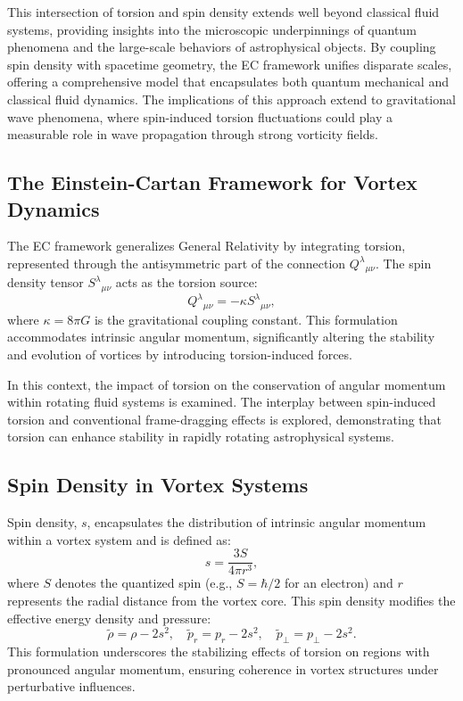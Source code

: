 \documentclass[a4paper,10pt]{article}
\begin{document}
This intersection of torsion and spin density extends well beyond classical fluid systems, providing insights into the microscopic underpinnings of quantum phenomena and the large-scale behaviors of astrophysical objects. By coupling spin density with spacetime geometry, the EC framework unifies disparate scales, offering a comprehensive model that encapsulates both quantum mechanical and classical fluid dynamics. The implications of this approach extend to gravitational wave phenomena, where spin-induced torsion fluctuations could play a measurable role in wave propagation through strong vorticity fields.


\subsection*{The Einstein-Cartan Framework for Vortex Dynamics}


The EC framework generalizes General Relativity by integrating torsion, represented through the antisymmetric part of the connection $Q^{\lambda}{}_{\mu\nu}$. The spin density tensor $S^{\lambda}{}_{\mu\nu}$ acts as the torsion source:
\begin{equation*}
Q^{\lambda}{}_{\mu\nu} = -\kappa S^{\lambda}{}_{\mu\nu},
\end{equation*}
where $\kappa = 8\pi G$ is the gravitational coupling constant. This formulation accommodates intrinsic angular momentum, significantly altering the stability and evolution of vortices by introducing torsion-induced forces.


In this context, the impact of torsion on the conservation of angular momentum within rotating fluid systems is examined. The interplay between spin-induced torsion and conventional frame-dragging effects is explored, demonstrating that torsion can enhance stability in rapidly rotating astrophysical systems.


\subsection*{Spin Density in Vortex Systems}


Spin density, $s$, encapsulates the distribution of intrinsic angular momentum within a vortex system and is defined as:
\begin{equation*}
s = \frac{3S}{4\pi r^3},
\end{equation*}
where $S$ denotes the quantized spin (e.g., $S = \hbar/2$ for an electron) and $r$ represents the radial distance from the vortex core. This spin density modifies the effective energy density and pressure:
\begin{equation*}
\tilde{\rho} = \rho - 2s^2, \quad \tilde{p}_r = p_r - 2s^2, \quad \tilde{p}_{\perp} = p_{\perp} - 2s^2.
\end{equation*}
This formulation underscores the stabilizing effects of torsion on regions with pronounced angular momentum, ensuring coherence in vortex structures under perturbative influences.
\end{document}
